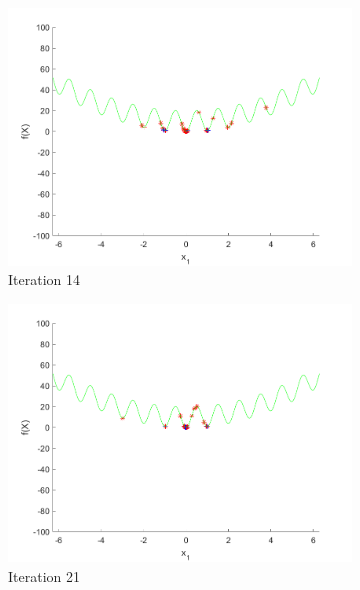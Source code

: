 \begin{figure}
\begin{subfigure}[b]{0.4\textwidth}
    \label{fig:s3-iter-1}
  \end{subfigure}
  \begin{subfigure}[b]{0.4\textwidth}
    \includegraphics[width=\textwidth]{img/smpl/rast1d/loa-iter-14}
    \caption{Iteration 14}
    \label{fig:s3-iter-2}
  \end{subfigure}
  \begin{subfigure}[b]{0.4\textwidth}
    \includegraphics[width=\textwidth]{img/smpl/rast1d/loa-iter-21}
    \caption{Iteration 21}
    \label{fig:s3-iter-3}
  \end{subfigure}
  \begin{subfigure}[b]{0.4\textwidth}

\end{subfigure}
\end{figure}
